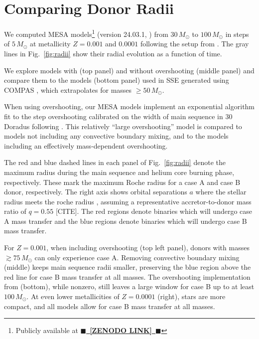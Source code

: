 \documentclass[twocolumn]{aastex63}
\DeclareRobustCommand{\Figref}[1]{Fig.~\ref{#1}}
\newcommand{\todo}[1]{{\large $\blacksquare$~\textbf{\color{red}[#1]}}~$\blacksquare$}
\begin{document}
\section{Comparing Donor Radii}

We computed \textsc{MESA} models\footnote{Publicly available at
  \href{LINK}{\todo{ZENODO LINK}}} (version 24.03.1,
\citealt{paxton:11, paxton:13, paxton:15, paxton:18, paxton:19,
  jermyn:23}) from $30 \, M_{\odot}$ to $100 \, M_{\odot}$ in steps of
$5\,M_\odot$ at metallicity $Z=0.001$ and $0.0001$ following the setup
from \cite{renzo:23}. The gray lines in \Figref{fig:radii} show their
radial evolution as a function of time.

We explore models with (top panel) and without overshooting (middle
panel) and compare them to the \cite{pols:98} models (bottom panel)
used in \textsc{SSE} \citep{hurley:00} generated using \textsc{COMPAS}
\citep{stevenson:17, vignagomez:18, riley:22}, which extrapolates for
masses $\geq50\,M_\odot$.

When using overshooting, our \textsc{MESA} models implement an
exponential algorithm \citep{herwig:00} fit to the step overshooting
calibrated on the width of main sequence in 30 Doradus
\citep{brott:11} following \cite{claret:18}. This relatively ``large
overshooting'' model is compared to models not including any
convective boundary mixing, and to the \cite{pols:98} models including
an effectively mass-dependent overshooting.

The red and blue dashed lines in each panel of \Figref{fig:radii}
denote the maximum radius during the main sequence and helium core
burning phase, respectively. These mark the maximum Roche radius for a
case A and case B donor, respectively. The right axis shows orbital
separations $a$ where the stellar radius meets the roche radius
\citep{eggleton:83}, assuming a representative
accretor-to-donor mass ratio of $q=0.55$ [CITE]. The red regions denote
binaries which will undergo case A mass transfer and the blue regions
denote binaries which will undergo case B mass transfer.

For $Z=0.001$, when including overshooting (top left panel), donors
with masses $ \gtrsim 75 \, M_{\odot}$ can only experience case A.
Removing convective boundary mixing (middle) keeps main sequence radii
smaller, preserving the blue region above the red line for case B mass
transfer at all masses. The overshooting implementation from
\cite{pols:98} (bottom), while nonzero, still leaves a large window
for case B up to at least $100 \, M_{\odot}$. At even lower
metallicities of $Z=0.0001$ (right), stars are more compact, and all
models allow for case B mass transfer at all masses.
\end{document}
